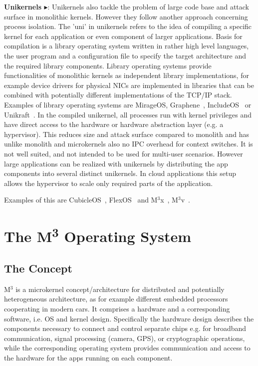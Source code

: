 \textbf{Unikernels\cite{madhavapeddy2014unikernels} $\blacktriangleright$}: Unikernels also tackle the problem of large code base and attack surface in monolithic kernels. However they follow another approach concerning process isolation. The 'uni' in unikernels refers to the idea of compiling a specific kernel for each application or even component of larger applications. Basis for compilation is a library operating system written in rather high level languages, the user program and a configuration file to specify the target architecture and the required library components. Library operating systems provide functionalities of monolithic kernels as independent library implementations, for example device drivers for physical NICs are implemented in libraries that can be combined with potentially different implementations of the TCP/IP stack. Examples of library operating systems are  MirageOS\cite{madhavapeddy2013unikernels}, Graphene~\cite{tsai2014Graphene}, IncludeOS~\cite{bratterud2015includeos} or Unikraft~\cite{kuenzer2021unikraft}.
In the compiled unikernel, all processes run with kernel privileges and have direct access to the hardware or hardware abstraction layer (e.g. a hypervisor). This reduces size and attack surface compared to monolith and has unlike monolith and microkernels also no IPC overhead for context switches. 
It is not well suited, and not intended to be used for multi-user scenarios. However large applications can be realized with unikernels by distributing the app components into several distinct unikernels. In cloud applications this setup allows the hypervisor to scale only required parts of the application. 

Examples of this are CubicleOS~\cite{sartakov2021cubicleos}, FlexOS~\cite{lefeuvre2021flexos} and M$^3$x~\cite{Asmussen:M3x}, M$^3$v~\cite{Asmussen:M3v}.


\section{The M\textsuperscript{3} Operating System}
\subsection{The Concept}
M$^3$\cite{Asmussen:M3x} is a microkernel concept/architecture for distributed and potentially heterogeneous architecture, as for example different embedded processors cooperating in modern cars. It comprises a hardware and a corresponding software, i.e. OS and kernel design. Specifically the hardware design describes the components necessary to connect and control separate chips e.g. for broadband communication, signal processing (camera, GPS), or cryptographic operations, while the corresponding operating system provides communication and access to the hardware for the apps running on each component.


